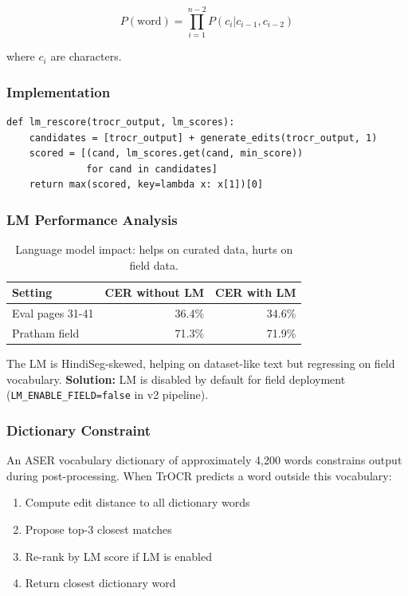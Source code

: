 \documentclass[14pt,a4paper]{article}
\begin{document}
\[ P(\text{word}) = \prod_{i=1}^{n-2} P(c_i | c_{i-1}, c_{i-2}) \]

where $c_i$ are characters.

\subsubsection{Implementation}

\begin{lstlisting}[caption=LM rescoring algorithm]
def lm_rescore(trocr_output, lm_scores):
    candidates = [trocr_output] + generate_edits(trocr_output, 1)
    scored = [(cand, lm_scores.get(cand, min_score))
              for cand in candidates]
    return max(scored, key=lambda x: x[1])[0]
\end{lstlisting}

\subsubsection{LM Performance Analysis}

\begin{table}[h]
    \centering
    \begin{tabular}{lrr}
        \toprule
        \textbf{Setting} & \textbf{CER without LM} & \textbf{CER with LM} \\
        \midrule
        Eval pages 31-41 & 36.4\% & 34.6\% \\
        Pratham field & 71.3\% & 71.9\% \\
        \bottomrule
    \end{tabular}
    \caption{Language model impact: helps on curated data, hurts on field data.}
\end{table}

The LM is HindiSeg-skewed, helping on dataset-like text but regressing on field vocabulary. \textbf{Solution:} LM is disabled by default for field deployment (\texttt{LM\_ENABLE\_FIELD=false} in v2 pipeline).

\subsubsection{Dictionary Constraint}

An ASER vocabulary dictionary of approximately 4,200 words constrains output during post-processing. When TrOCR predicts a word outside this vocabulary:

\begin{enumerate}
    \item Compute edit distance to all dictionary words
    \item Propose top-3 closest matches
    \item Re-rank by LM score if LM is enabled
    \item Return closest dictionary word
\end{enumerate}
\end{document}
